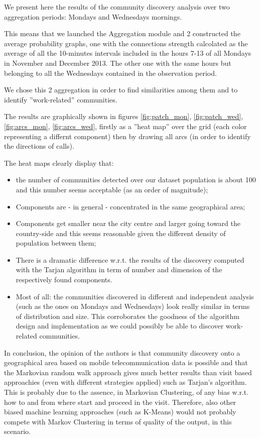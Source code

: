 \documentclass[12pt,a4paper]{article}
\begin{document}
We present here the results of the community discovery analysis
over two aggregation periods: Mondays and Wednesdays mornings.

This means that we launched the Aggregation module and 2 constructed 
the average probability graphs, one with the connections strength
calcolated as the average of all the 10-minutes intervals included in
the hours 7-13 of all Mondays in November and December 2013. The other
one with the same hours but belonging to all the Wednesdays contained
in the observation period.

We chose this 2 aggregation in order to find similarities among them and to
identify ''work-related'' communities.

The results are graphically shown in figures \ref{fig:patch_mon}, \ref{fig:patch_wed},
\ref{fig:arcs_mon}, \ref{fig:arcs_wed}, firstly as a ''heat map'' over the grid
(each color representing a differnt component) then by drawing all arcs (in
order to identify the directions of calls).

The heat maps clearly display that:
\begin{itemize}
\item the number of communities detected over our dataset population is about
100 and this number seems acceptable (as an order of magnitude);
\item Components are - in general - concentrated in the same geographical area;
\item Components get smaller near the city centre and larger going toward the
country-side and this seems reasonable given the different density of population
between them;
\item There is a dramatic difference w.r.t. the results of the discovery
computed with the Tarjan algorithm in term of number and dimension of the
respectively found components.
\item Most of all: the communities discovered in different and independent
analysis (such as the ones on Mondays and Wednesdays) look really similar
in terms of distribution and size. This corroborates the goodness of the
algorithm design and implementation as we could possibly be able to
discover work-related communities.
\end{itemize}

In conclusion, the opinion of the authors is that community discovery
onto a geographical area based on mobile telecommunication data
is possible and that the Markovian random walk approach gives much better
results than visit based approachies (even with different strategies applied)
such as Tarjan's algorithm. This is probably due to the assence,
in Markovian Clustering, of any bias w.r.t. how to and from where start
and proceed in the visit. Therefore, also other biased machine learning
approaches (such as K-Means) would not probably compete with Markov
Clustering in terms of quality of the output, in this scenario.
\end{document}

